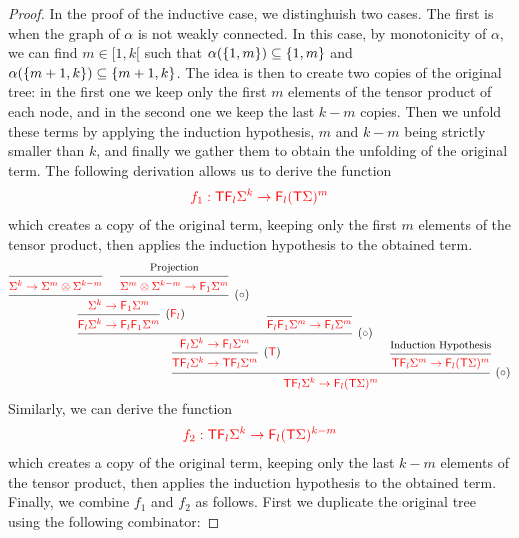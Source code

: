 \begin{proof}
In the proof of the inductive case, we distinghuish two cases. The first is when the graph of $\alpha$ is not weakly connected. In this case, by monotonicity of $\alpha$, we can find $m\in [1,k[$ such that $\alpha(\{1,m\})\subseteq\{1,m\}$ and $\alpha(\{m+1,k\})\subseteq\{m+1,k\}$. The idea is then to create two copies of the original tree: in the first one we keep only the first $m$ elements of the tensor product of each node, and in the second one we keep the last $k-m$ copies. Then we unfold these terms by applying the induction hypothesis, $m$ and $k-m$ being strictly smaller than $k$, and  finally we gather them to obtain the  unfolding of the original term. 
The following derivation allows us to derive the function  
\begin{align*}
{\color{red}{f_1:{\color{red}{\mathsf T}}{\color{red}{\mathsf F_{l}}}\Sigma^k \to {\color{red}{\mathsf F_{l}}}({\color{red}{\mathsf T}}\Sigma)^m}}
\end{align*}
which creates a copy of the original term, keeping only the first $m$ elements of the tensor product, then applies the induction hypothesis to the obtained term.
\begin{align*}
\begin{prooftree}
\Infer{0}{\ranked{\Sigma^k\to \Sigma^m\otimes \Sigma^{k-m}}}
\Hypo{\text{\small Projection}}
\Infer{1}[]{\ranked{\Sigma^m\otimes \Sigma^{k-m} \to \reduce 1 \Sigma^m}}
\Infer{2}[$(\circ)$]{\ranked{\Sigma^k \to \reduce 1 \Sigma^m}}
\Infer{1}[$(\reduce l)$]{\ranked{\reduce l \Sigma^k \to \reduce l \reduce 1 \Sigma^m}}
\Infer{0}[]{\ranked{\reduce l \reduce 1 \Sigma^m \to \reduce l \Sigma^m}}
\Infer{2}[$(\circ)$]{\ranked{\reduce l \Sigma^k \to \reduce l \Sigma^m}}
\Infer{1}[$(\tmonad)$]{\ranked{\tmonad \reduce l \Sigma^k \to \tmonad \reduce l \Sigma^m}}
\Hypo{\text{\small Induction Hypothesis}}
\Infer{1}[]{\ranked{\tmonad \reduce l \Sigma^m \to \reduce l (\tmonad \Sigma)^m}}
\Infer{2}[$(\circ)$]{\ranked{\tmonad \reduce l \Sigma^k \to \reduce l (\tmonad \Sigma)^m}}
\end{prooftree}
\end{align*}
Similarly, we can derive the function
\begin{align*}
{\color{red}{f_2:{\color{red}{\mathsf T}}{\color{red}{\mathsf F_{l}}}\Sigma^k \to {\color{red}{\mathsf F_{l}}}({\color{red}{\mathsf T}}\Sigma)^{k-m}}}
\end{align*}
which creates a copy of the original term, keeping only the last $k-m$ elements of the tensor product, then applies the induction hypothesis to the obtained term.
Finally, we combine $f_1$ and $f_2$ as follows. First we duplicate the original tree using the following combinator:

\end{proof}
